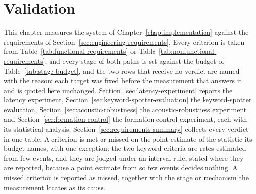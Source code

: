 %
%

\chapter{Validation}
\label{chap:validation}
This chapter measures the system of Chapter~\ref{chap:implementation} against the requirements of
Section~\ref{sec:engineering-requirements}. Every criterion is taken from
Table~\ref{tab:functional-requirements} or Table~\ref{tab:nonfunctional-requirements}, and every
stage of both paths is set against the budget of Table~\ref{tab:stage-budget}, and the two rows
that receive no verdict are named with the reason; each target was
fixed before the measurement that answers it and is quoted here unchanged.
Section~\ref{sec:latency-experiment} reports the latency experiment,
Section~\ref{sec:keyword-spotter-evaluation} the keyword-spotter evaluation,
Section~\ref{sec:acoustic-robustness} the acoustic-robustness experiment and
Section~\ref{sec:formation-control} the formation-control experiment, each with its statistical
analysis. Section~\ref{sec:requirements-summary} collects every verdict in one table. A criterion
is met or missed on the point estimate of the statistic its budget names, with one exception: the
two keyword criteria are rates estimated from few events, and they are judged under an interval rule,
stated where they are reported, because a point estimate from so few events decides nothing. A missed
criterion is reported as missed,
together with the stage or mechanism the measurement locates as its cause.

